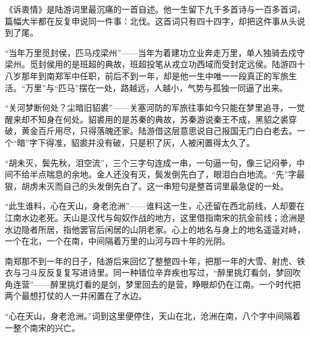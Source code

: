 \begin{appreciation}
《诉衷情》是陆游词里最沉痛的一首自述。他一生留下九千多首诗与一百多首词，篇幅大半都在反复申说同一件事：北伐。这首词只有四十四字，却把这件事从头说到了尾。

“当年万里觅封侯，匹马戍梁州”——当年为着建功立业奔走万里，单人独骑去戍守梁州。觅封侯用的是班超的典故，班超投笔从戎立功西域而受封定远侯。陆游四十八岁那年到南郑军中任职，前后不到一年，却是他一生中唯一一段真正的军旅生活。“万里”与“匹马”摆在一处，路越远，人越小，气势与孤独一同逼了出来。

“关河梦断何处？尘暗旧貂裘”——关塞河防的军旅往事如今只能在梦里追寻，一觉醒来却不知身在何处。貂裘用的是苏秦的典故，苏秦游说秦王不成，黑貂之裘穿破，黄金百斤用尽，只得落魄还家。陆游借这层意思说自己报国无门白白老去。一个“暗”字下得准，貂裘并没有破，只是积了灰，人被闲置得太久了。

“胡未灭，鬓先秋，泪空流”，三个三字句连成一串，一句逼一句，像三记闷拳，中间不给半点喘息的余地。金人还没有灭，鬓发倒先白了，眼泪白白地流。“先”字最狠，胡虏未灭而自己的头发倒先白了。这一串短句是整首词里最急促的一处。

“此生谁料，心在天山，身老沧洲”——谁料这一生，心还留在西北前线，人却要在江南水边老死。天山是汉代与匈奴作战的地方，这里借指南宋的抗金前线；沧洲是水边隐者所居，指他罢官后闲居的山阴老家。心上的地名与身上的地名遥遥对峙，一个在北，一个在南，中间隔着万里的山河与四十年的光阴。

南郑那不到一年的日子，陆游后来回忆了整整四十年，把那一年的大雪、射虎、铁衣与刁斗反反复复写进诗里。同一种错位辛弃疾也写过，“醉里挑灯看剑，梦回吹角连营”——醉里挑灯看的是剑，梦里回去的是营，睁眼却仍在江南。一个时代把两个最想打仗的人一并闲置在了水边。

“心在天山，身老沧洲。”词到这里便停住，天山在北，沧洲在南，八个字中间隔着一整个南宋的兴亡。
\end{appreciation}
